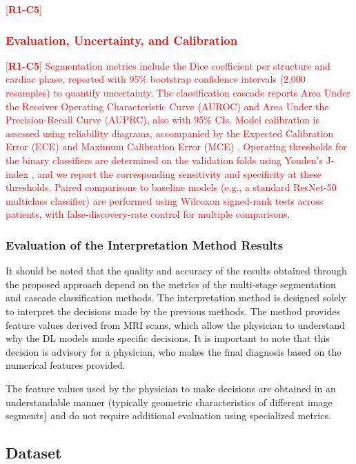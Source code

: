 \documentclass[fleqn,10pt]{wlscirep}
\newcommand{\revtag}[2]{[\textbf{R#1-C#2}]}
\newcommand{\Rone}[1]{\textcolor{red}{#1}}
\begin{document}
\Rone{\revtag{1}{5}\subsubsection*{Evaluation, Uncertainty, and Calibration}}
\Rone{\revtag{1}{5} %
Segmentation metrics include the Dice coefficient per structure and cardiac phase, reported with 95\% bootstrap confidence intervals (2,000 resamples) to quantify uncertainty. The classification cascade reports Area Under the Receiver Operating Characteristic Curve (AUROC) and Area Under the Precision-Recall Curve (AUPRC), also with 95\% CIs. Model calibration is assessed using reliability diagrams, accompanied by the Expected Calibration Error (ECE) and Maximum Calibration Error (MCE) \cite{Guo:2017}. Operating thresholds for the binary classifiers are determined on the validation folds using Youden’s J-index \cite{Youden:1950}, and we report the corresponding sensitivity and specificity at these thresholds. Paired comparisons to baseline models (e.g., a standard ResNet-50 multiclass classifier) are performed using Wilcoxon signed-rank tests across patients, with false-discovery-rate control for multiple comparisons.
}

\subsubsection*{Evaluation of the Interpretation Method Results}

It should be noted that the quality and accuracy of the results obtained through the proposed approach depend on the metrics of the multi-stage segmentation and cascade classification methods. The interpretation method is designed solely to interpret the decisions made by the previous methods. The method provides feature values derived from MRI scans, which allow the physician to understand why the DL models made specific decisions. It is important to note that this decision is advisory for a physician, who makes the final diagnosis based on the numerical features provided.

The feature values used by the physician to make decisions are obtained in an understandable manner (typically geometric characteristics of different image segments) and do not require additional evaluation using specialized metrics.

\subsection*{Dataset}
\end{document}

